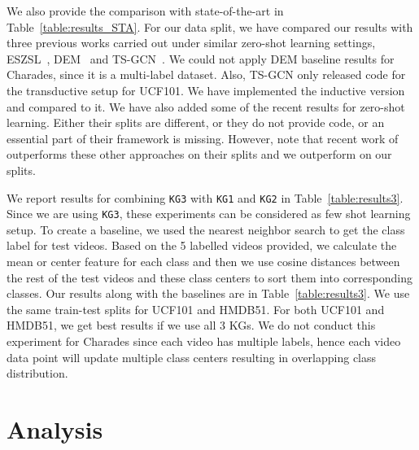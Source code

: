 We also provide the comparison with state-of-the-art in Table~\ref{table:results_STA}. For our data split, we have compared our results with three previous works carried out under similar zero-shot learning settings,  ESZSL~\cite{romera2015embarrassingly}, DEM~\cite{zhang2017learning} and TS-GCN~\cite{gao2019know}. We could not apply DEM baseline results for Charades, since it is a multi-label dataset. Also, TS-GCN only released code for the transductive setup for UCF101. We have implemented the inductive version and compared to it. We have also added some of the recent results for zero-shot learning. Either their splits are different, or they do not provide code, or an essential part of their framework is missing. However, note that recent work of \cite{gao2019know} outperforms these other approaches on their splits and we outperform \cite{gao2019know} on our splits.

We report results for combining \texttt{KG3} with \texttt{KG1} and \texttt{KG2} in Table~\ref{table:results3}. Since we are using \texttt{KG3}, these experiments can be considered as few shot learning setup. To create a baseline, we used the nearest neighbor search to get the class label for test videos. Based on the 5 labelled videos provided, we calculate the mean or center feature for each class and then we use cosine distances between the rest of the test videos and these class centers to sort them into corresponding classes.
Our results along with the baselines are in Table~\ref{table:results3}. We use the same train-test splits for UCF101 and HMDB51. For both UCF101 and HMDB51, we get best results if we use all 3 KGs. We do not conduct this experiment for Charades since each video has multiple labels, hence each video data point will update multiple class centers resulting in overlapping class distribution.




\begin{table*}
\centering
\caption{Few-shot learning results for the UCF101 and HMDB51 datasets. The baseline is nearest neighbor, given 5 videos for each test set. The combination of \texttt{KG1}, \texttt{KG2} and \texttt{KG3} does the best in both cases.}
\label{table:results3}
\end{table*} \section{Analysis}
\label{sec:disc}

